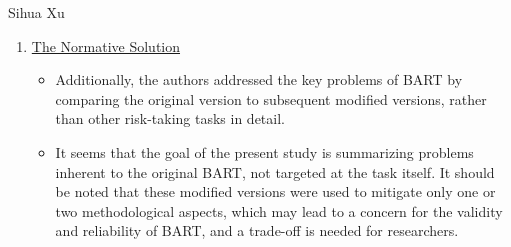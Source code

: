 \documentclass[serif, twocolumn, review]{jote-article}
\begin{document}
\begin{paracol}{2}
\begin{reviewend}{Sihua Xu}
\begin{enumerate}[label=\textbf{\arabic*}), start=0]
    \item \hyperref[sec:normative]{The Normative Solution}
        \begin{itemize}
            \item Additionally, the authors addressed the key problems of BART by comparing the original version to subsequent modified versions, rather than other risk-taking tasks in detail. 
            \item It seems that the goal of the present study is summarizing problems inherent to the original BART, not targeted at the task itself. It should be noted that these modified versions were used to mitigate only one or two methodological aspects, which may lead to a concern for the validity and reliability of BART, and a trade-off is needed for researchers.
        \end{itemize}


\end{enumerate}
\end{reviewend}
\end{paracol}
\end{document}
